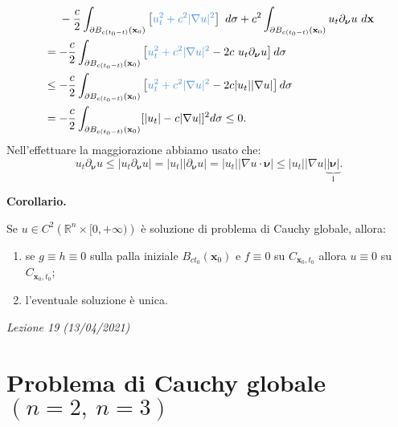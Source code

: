 \documentclass[10pt,a4paper,twoside,openright]{book}
\begin{document}
\begin{dimostrazione}
\begin{align*}
		            & \ \ \ \ -\frac{c}{2}\int _{\partial B_{c( t_{0} -t)}(\mathbf{x}_{0})}\left[\textcolor[rgb]{0.29,0.56,0.89}{u_{t}^{2}+c^{2}| \nabla u| ^{2}}\right] \ d\sigma +c^{2}\int _{\partial B_{c( t_{0} -t)}(\mathbf{x}_{0})} u_{t} \partial _{\bm{\nu }} u\ d\mathbf{x} \\
		            & =-\frac{c}{2}\int _{\partial B_{c( t_{0} -t)}(\mathbf{x}_{0})}\left[\textcolor[rgb]{0.29,0.56,0.89}{u_{t}^{2}+c^{2}| \nabla u| ^{2}} -2c\ u_{t} \partial _{\bm{\nu }} u\right] d\sigma                                                                          \\
		            & \leqslant -\frac{c}{2}\int _{\partial B_{c( t_{0} -t)}(\mathbf{x}_{0})}\left[\textcolor[rgb]{0.29,0.56,0.89}{u_{t}^{2}+c^{2}| \nabla u| ^{2}} -2c| u_{t}| | \nabla u| \right] d\sigma                                                                           \\
		            & =-\frac{c}{2}\int _{\partial B_{c( t_{0} -t)}(\mathbf{x}_{0})}[| u_{t}| -c| \nabla u| ]^{2} d\sigma \leqslant 0.                                                                                                                                                                                                                                                                                                                                                                                       
	\end{align*}
	Nell'effettuare la maggiorazione abbiamo usato che:
	\begin{equation*}
		u_{t} \partial _{\bm{\nu }} u\leqslant |u_{t} \partial _{\bm{\nu }} u|=|u_{t} ||\partial _{\bm{\nu }} u|=|u_{t} ||\nabla u\cdotp \bm{\nu } |\leqslant |u_{t} ||\nabla u|\underbrace{|\bm{\nu } |}_{1}.
	\end{equation*}
\end{dimostrazione}
\textbf{Corollario.}

Se $u\in C^{2}\left(\mathbb{R}^{n} \times [ 0,+\infty )\right)$ è soluzione di problema di Cauchy globale, allora:
\begin{enumerate}
	\item se $g\equiv h\equiv 0$ sulla palla iniziale $B_{ct_{0}}(\mathbf{x}_{0})$ e $f\equiv 0$ su $C_{\mathbf{x}_{0} ,t_{0}}$ allora $u\equiv 0$ su $C_{\mathbf{x}_{0} ,t_{0}}$;
	\item l'eventuale soluzione è unica.
\end{enumerate}

\textit{Lezione 19 (13/04/2021)}
\section{Problema di Cauchy globale \texorpdfstring{$(n=2,\ n=3)$}{(n=2, n=3)}}
\end{document}
